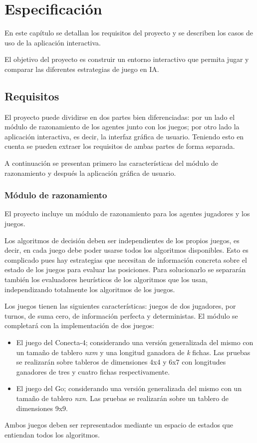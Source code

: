 \chapter{Especificación}
\label{cap:especificacion}
En este capítulo se detallan los requisitos del proyecto y se describen los casos de uso de la aplicación interactiva.

\bigskip
El objetivo del proyecto es construir un entorno interactivo que permita jugar y  comparar las diferentes estrategias de juego en IA.

\section{Requisitos}
\label{sec:requisitos}
El proyecto puede dividirse en dos partes bien diferenciadas: por un lado el módulo de razonamiento de los agentes junto con los juegos; por otro lado la aplicación interactiva, es decir, la interfaz gráfica de usuario.
Teniendo esto en cuenta se pueden extraer los requisitos de ambas partes de forma separada.

\bigskip
A continuación se presentan primero las características del módulo de razonamiento y después la aplicación gráfica de usuario.

\subsection{Módulo de razonamiento}
\label{ssec:modulo_razonamiento}
El proyecto incluye un módulo de razonamiento para los agentes jugadores y los juegos.

Los algoritmos de decisión deben ser independientes de los propios juegos, es decir, en cada juego debe poder usarse todos los algoritmos disponibles.
Esto es complicado pues hay estrategias que necesitan de información concreta sobre el estado de los juegos para evaluar las posiciones.
Para solucionarlo se separarán también los evaluadores heurísticos de los algoritmos que los usan, independizando totalmente los algoritmos de los juegos.

Los juegos tienen las siguientes características: juegos de dos jugadores, por turnos, de suma cero, de información perfecta y deterministas.
El módulo se completará con la implementación de dos juegos:
\begin{itemize}
\renewcommand{\labelitemi}{$\bullet$}
	\item El juego del Conecta-4; considerando una versión generalizada del mismo con un tamaño de tablero \textit{nxm} y una longitud ganadora de \textit{k} fichas.
	Las pruebas se realizarán sobre tableros de dimensiones 4x4 y 6x7 con longitudes ganadores de tres y cuatro fichas respectivamente.
	\item El juego del Go; considerando una versión generalizada del mismo con un tamaño de tablero \textit{nxn}.
	Las pruebas se realizarán sobre un tablero de dimensiones 9x9.
\end{itemize}
Ambos juegos deben ser representados mediante un espacio de estados que entiendan todos los algoritmos.

